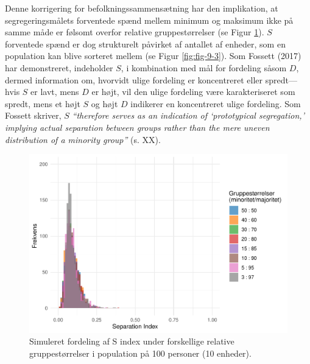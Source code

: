 \documentclass[
]{book}
\begin{document}
Denne korrigering for befolkningssammensætning har den implikation, at segregeringsmålets forventede spænd mellem minimum og maksimum ikke på samme måde er følsomt overfor relative gruppestørrelser (se Figur \ref{fig:fig-9-2}). \(S\) forventede spænd er dog strukturelt påvirket af antallet af enheder, som en population kan blive sorteret mellem (se Figur \ref{fig:fig-9-3}). Som Fossett (2017) har demonstreret, indeholder \(S\), i kombination med mål for fordeling såsom \(D\), dermed information om, hvorvidt ulige fordeling er koncentreret eller spredt---hvis \(S\) er lavt, mens \(D\) er højt, vil den ulige fordeling være karakteriseret som spredt, mens et højt \(S\) og højt \(D\) indikerer en koncentreret ulige fordeling. Som Fossett skriver, \(S\) \emph{``therefore serves as an indication of `prototypical segregation,' implying actual separation between groups rather than the mere uneven distribution of a minority group''} (s. XX).

\begin{figure}
\includegraphics[width=1\linewidth]{en-befolkning-blander-sig_files/figure-latex/fig-9-2-1} \caption{Simuleret fordeling af S index under forskellige relative gruppestørrelser i population på 100 personer (10 enheder).}\label{fig:fig-9-2}
\end{figure}
\end{document}
